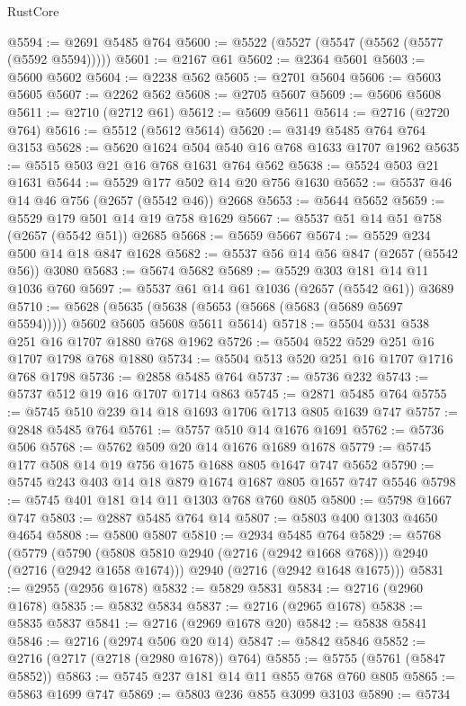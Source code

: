 \begin{lexlean}{RustCore}
\begin{coremodule}
@5594 := @2691 @5485 @764
@5600 := @5522 (@5527 (@5547 (@5562 (@5577 (@5592 @5594)))))
@5601 := @2167 @61
@5602 := @2364 @5601
@5603 := @5600 @5602
@5604 := @2238 @562
@5605 := @2701 @5604
@5606 := @5603 @5605
@5607 := @2262 @562
@5608 := @2705 @5607
@5609 := @5606 @5608
@5611 := @2710 (@2712 @61)
@5612 := @5609 @5611
@5614 := @2716 (@2720 @764)
@5616 := @5512 (@5612 @5614)
@5620 := @3149 @5485 @764 @764 @3153
@5628 := @5620 @1624 @504 @540 @16 @768 @1633 @1707 @1962
@5635 := @5515 @503 @21 @16 @768 @1631 @764 @562
@5638 := @5524 @503 @21 @1631
@5644 := @5529 @177 @502 @14 @20 @756 @1630
@5652 := @5537 @46 @14 @46 @756 (@2657 (@5542 @46)) @2668
@5653 := @5644 @5652
@5659 := @5529 @179 @501 @14 @19 @758 @1629
@5667 := @5537 @51 @14 @51 @758 (@2657 (@5542 @51)) @2685
@5668 := @5659 @5667
@5674 := @5529 @234 @500 @14 @18 @847 @1628
@5682 := @5537 @56 @14 @56 @847 (@2657 (@5542 @56)) @3080
@5683 := @5674 @5682
@5689 := @5529 @303 @181 @14 @11 @1036 @760
@5697 := @5537 @61 @14 @61 @1036 (@2657 (@5542 @61)) @3689
@5710 := @5628
    (@5635 (@5638 (@5653 (@5668 (@5683 (@5689 @5697 @5594))))) @5602 @5605 @5608 @5611 @5614)
@5718 := @5504 @531 @538 @251 @16 @1707 @1880 @768 @1962
@5726 := @5504 @522 @529 @251 @16 @1707 @1798 @768 @1880
@5734 := @5504 @513 @520 @251 @16 @1707 @1716 @768 @1798
@5736 := @2858 @5485 @764
@5737 := @5736 @232
@5743 := @5737 @512 @19 @16 @1707 @1714 @863
@5745 := @2871 @5485 @764
@5755 := @5745 @510 @239 @14 @18 @1693 @1706 @1713 @805 @1639 @747
@5757 := @2848 @5485 @764
@5761 := @5757 @510 @14 @1676 @1691
@5762 := @5736 @506
@5768 := @5762 @509 @20 @14 @1676 @1689 @1678
@5779 := @5745 @177 @508 @14 @19 @756 @1675 @1688 @805 @1647 @747 @5652
@5790 := @5745 @243 @403 @14 @18 @879 @1674 @1687 @805 @1657 @747 @5546
@5798 := @5745 @401 @181 @14 @11 @1303 @768 @760 @805
@5800 := @5798 @1667 @747
@5803 := @2887 @5485 @764 @14
@5807 := @5803 @400 @1303 @4650 @4654
@5808 := @5800 @5807
@5810 := @2934 @5485 @764
@5829 := @5768
    (@5779
      (@5790 (@5808 @5810 @2940 (@2716 (@2942 @1668 @768))) @2940 (@2716 (@2942 @1658 @1674)))
      @2940
      (@2716 (@2942 @1648 @1675)))
@5831 := @2955 (@2956 @1678)
@5832 := @5829 @5831
@5834 := @2716 (@2960 @1678)
@5835 := @5832 @5834
@5837 := @2716 (@2965 @1678)
@5838 := @5835 @5837
@5841 := @2716 (@2969 @1678 @20)
@5842 := @5838 @5841
@5846 := @2716 (@2974 @506 @20 @14)
@5847 := @5842 @5846
@5852 := @2716 (@2717 (@2718 (@2980 @1678)) @764)
@5855 := @5755 (@5761 (@5847 @5852))
@5863 := @5745 @237 @181 @14 @11 @855 @768 @760 @805
@5865 := @5863 @1699 @747
@5869 := @5803 @236 @855 @3099 @3103
@5890 := @5734

\end{coremodule}
\end{lexlean}
